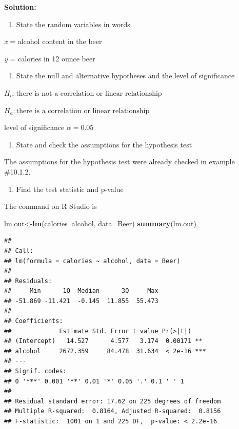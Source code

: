 \documentclass[
]{book}
\newenvironment{Shaded}{\begin{snugshade}}{\end{snugshade}}
\newcommand{\DataTypeTok}[1]{\textcolor[rgb]{0.13,0.29,0.53}{#1}}
\newcommand{\KeywordTok}[1]{\textcolor[rgb]{0.13,0.29,0.53}{\textbf{#1}}}
\newcommand{\NormalTok}[1]{#1}
\newcommand{\OperatorTok}[1]{\textcolor[rgb]{0.81,0.36,0.00}{\textbf{#1}}}
\providecommand{\tightlist}{%
  \setlength{\itemsep}{0pt}\setlength{\parskip}{0pt}}
\begin{document}
\textbf{Solution:}

\begin{enumerate}
\def\labelenumi{\arabic{enumi}.}
\tightlist
\item
  State the random variables in words.
\end{enumerate}

\emph{x} = alcohol content in the beer

\emph{y} = calories in 12 ounce beer

\begin{enumerate}
\def\labelenumi{\arabic{enumi}.}
\setcounter{enumi}{1}
\tightlist
\item
  State the null and alternative hypotheses and the level of significance
\end{enumerate}

\(H_o: \text{there is not a correlation or linear relationship}\)

\(H_a: \text{there is a correlation or linear relationship}\)

level of significance \(\alpha=0.05\)

\begin{enumerate}
\def\labelenumi{\arabic{enumi}.}
\setcounter{enumi}{2}
\tightlist
\item
  State and check the assumptions for the hypothesis test
\end{enumerate}

The assumptions for the hypothesis test were already checked in example \#10.1.2.

\begin{enumerate}
\def\labelenumi{\arabic{enumi}.}
\setcounter{enumi}{3}
\tightlist
\item
  Find the test statistic and p-value
\end{enumerate}

The command on R Studio is

\begin{Shaded}
\begin{Highlighting}[]
\NormalTok{lm.out<-}\KeywordTok{lm}\NormalTok{(calories}\OperatorTok{~}\NormalTok{alcohol, }\DataTypeTok{data=}\NormalTok{Beer)}
\KeywordTok{summary}\NormalTok{(lm.out)}
\end{Highlighting}
\end{Shaded}

\begin{verbatim}
## 
## Call:
## lm(formula = calories ~ alcohol, data = Beer)
## 
## Residuals:
##     Min      1Q  Median      3Q     Max 
## -51.869 -11.421  -0.145  11.855  55.473 
## 
## Coefficients:
##             Estimate Std. Error t value Pr(>|t|)    
## (Intercept)   14.527      4.577   3.174  0.00171 ** 
## alcohol     2672.359     84.478  31.634  < 2e-16 ***
## ---
## Signif. codes:  
## 0 '***' 0.001 '**' 0.01 '*' 0.05 '.' 0.1 ' ' 1
## 
## Residual standard error: 17.62 on 225 degrees of freedom
## Multiple R-squared:  0.8164, Adjusted R-squared:  0.8156 
## F-statistic:  1001 on 1 and 225 DF,  p-value: < 2.2e-16
\end{verbatim}
\end{document}
